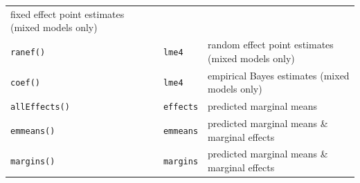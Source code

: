\documentclass[]{book}
\begin{document}
\begin{longtable}[]{@{}lll@{}}
\begin{minipage}[t]{0.59\columnwidth}
fixed effect point estimates (mixed models only)\strut
\end{minipage}\tabularnewline
\begin{minipage}[t]{0.16\columnwidth}\raggedright
\texttt{ranef()}\strut
\end{minipage} & \begin{minipage}[t]{0.17\columnwidth}\raggedright
\texttt{lme4}\strut
\end{minipage} & \begin{minipage}[t]{0.59\columnwidth}\raggedright
random effect point estimates (mixed models only)\strut
\end{minipage}\tabularnewline
\begin{minipage}[t]{0.16\columnwidth}\raggedright
\texttt{coef()}\strut
\end{minipage} & \begin{minipage}[t]{0.17\columnwidth}\raggedright
\texttt{lme4}\strut
\end{minipage} & \begin{minipage}[t]{0.59\columnwidth}\raggedright
empirical Bayes estimates (mixed models only)\strut
\end{minipage}\tabularnewline
\begin{minipage}[t]{0.16\columnwidth}\raggedright
\texttt{allEffects()}\strut
\end{minipage} & \begin{minipage}[t]{0.17\columnwidth}\raggedright
\texttt{effects}\strut
\end{minipage} & \begin{minipage}[t]{0.59\columnwidth}\raggedright
predicted marginal means\strut
\end{minipage}\tabularnewline
\begin{minipage}[t]{0.16\columnwidth}\raggedright
\texttt{emmeans()}\strut
\end{minipage} & \begin{minipage}[t]{0.17\columnwidth}\raggedright
\texttt{emmeans}\strut
\end{minipage} & \begin{minipage}[t]{0.59\columnwidth}\raggedright
predicted marginal means \& marginal effects\strut
\end{minipage}\tabularnewline
\begin{minipage}[t]{0.16\columnwidth}\raggedright
\texttt{margins()}\strut
\end{minipage} & \begin{minipage}[t]{0.17\columnwidth}\raggedright
\texttt{margins}\strut
\end{minipage} & \begin{minipage}[t]{0.59\columnwidth}\raggedright
predicted marginal means \& marginal effects\strut
\end{minipage}\tabularnewline
\bottomrule
\end{longtable}
\end{document}
